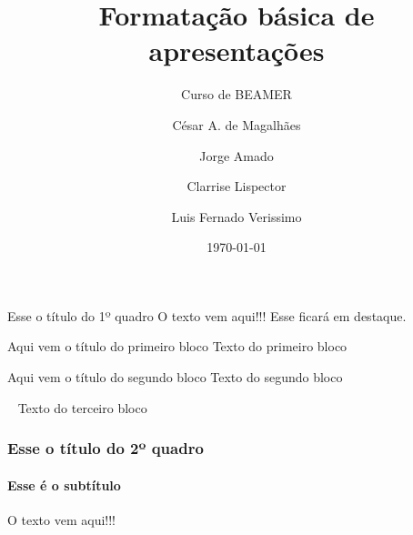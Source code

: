 \documentclass[aspectratio=169]{beamer}
\title{Formatação básica de apresentações}
\subtitle{Curso de BEAMER}
\author[César \and Jorge \and Clarrise \and Luis]{César A. de Magalhães \and Jorge Amado \and Clarrise Lispector \and Luis Fernado Verissimo}
\institute[UNOPAR]{Universidade do Norte do Paraná \\ https://vestibular.unoparead.com.br}
\date{\today}
\begin{document}
	\begin{frame}
		\titlepage
	\end{frame}
	\begin{frame}{Esse o título do 1º quadro}
		O texto vem aqui!!!
		\alert{Esse ficará em destaque.} \pause
		\begin{block}{Aqui vem o título do primeiro bloco}
			Texto do primeiro bloco
		\end{block}\pause	
		\begin{block}{Aqui vem o título do segundo bloco}
			Texto do segundo bloco
		\end{block}\pause
		\begin{block}{\ }
			Texto do terceiro bloco
		\end{block}
	\end{frame}
	\begin{frame}
		\frametitle{Esse o título do 2º quadro}
		\framesubtitle{Esse é o subtítulo}
		O texto vem aqui!!!
	\end{frame}
\end{document}
